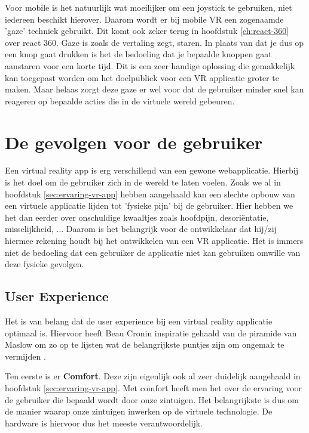 Voor mobile is het natuurlijk wat moeilijker om een joystick te gebruiken, niet iedereen beschikt hierover. Daarom wordt er bij mobile VR een zogenaamde 'gaze' techniek gebruikt. Dit komt ook zeker terug in hoofdstuk \ref{ch:react-360} over react 360. Gaze is zoals de vertaling zegt, staren. In plaats van dat je dus op een knop gaat drukken is het de bedoeling dat je bepaalde knoppen gaat aanstaren voor een korte tijd. Dit is een zeer handige oplossing die gemakkelijk kan toegepast worden om het doelpubliek voor een VR applicatie groter te maken. Maar helaas zorgt deze gaze er wel voor dat de gebruiker minder snel kan reageren op bepaalde acties die in de virtuele wereld gebeuren.


\section{De gevolgen voor de gebruiker}
\label{sec:gevolgen-vr}
Een virtual reality app is erg verschillend van een gewone webapplicatie. Hierbij is het doel om de gebruiker zich in de wereld te laten voelen. Zoals we al in hoofdstuk \ref{sec:ervaring-vr-app} hebben aangehaald kan een slechte opbouw van een virtuele applicatie lijden tot 'fysieke pijn' bij de gebruiker. Hier hebben we het dan eerder over onschuldige kwaaltjes zoals hoofdpijn, desoriëntatie, misselijkheid, ... Daarom is het belangrijk voor de ontwikkelaar dat hij/zij hiermee rekening houdt bij het ontwikkelen van een VR applicatie. Het is immers niet de bedoeling dat een gebruiker de applicatie niet kan gebruiken omwille van deze fysieke gevolgen.

\subsection{User Experience}
\label{subsec:user-experience}
Het is van belang dat de user experience bij een virtual reality applicatie optimaal is. Hiervoor heeft Beau Cronin inspiratie gehaald van de piramide van Maslow om zo op te lijsten wat de belangrijkste puntjes zijn om ongemak te vermijden \autocite{Cronin2015}.

Ten eerste is er \textbf{Comfort}. Deze zijn eigenlijk ook al zeer duidelijk aangehaald in hoofdstuk \ref{sec:ervaring-vr-app}. Met comfort heeft men het over de ervaring voor de gebruiker die bepaald wordt door onze zintuigen. Het belangrijkste is dus om de manier waarop onze zintuigen inwerken op de virtuele technologie. De hardware is hiervoor dus het meeste verantwoordelijk.

